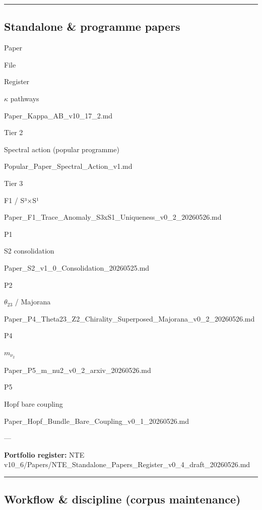 \documentclass[
  11pt,
]{article}
\begin{document}
\begin{center}\rule{0.5\linewidth}{0.5pt}\end{center}

\subsection{Standalone \& programme
papers}\label{standalone-programme-papers}

Paper

File

Register

\(\kappa\) pathways

Paper\_Kappa\_AB\_v10\_17\_2.md

Tier 2

Spectral action (popular programme)

Popular\_Paper\_Spectral\_Action\_v1.md

Tier 3

F1 / S³×S¹

Paper\_F1\_Trace\_Anomaly\_S3xS1\_Uniqueness\_v0\_2\_20260526.md

P1

S2 consolidation

Paper\_S2\_v1\_0\_Consolidation\_20260525.md

P2

\(\theta_{23}\) / Majorana

Paper\_P4\_Theta23\_Z2\_Chirality\_Superposed\_Majorana\_v0\_2\_20260526.md

P4

\(m_{\nu_2}\)

Paper\_P5\_m\_nu2\_v0\_2\_arxiv\_20260526.md

P5

Hopf bare coupling

Paper\_Hopf\_Bundle\_Bare\_Coupling\_v0\_1\_20260526.md

---

\textbf{Portfolio register:} NTE
v10\_6/Papers/NTE\_Standalone\_Papers\_Register\_v0\_4\_draft\_20260526.md

\begin{center}\rule{0.5\linewidth}{0.5pt}\end{center}

\subsection{Workflow \& discipline (corpus
maintenance)}\label{workflow-discipline-corpus-maintenance}
\end{document}
